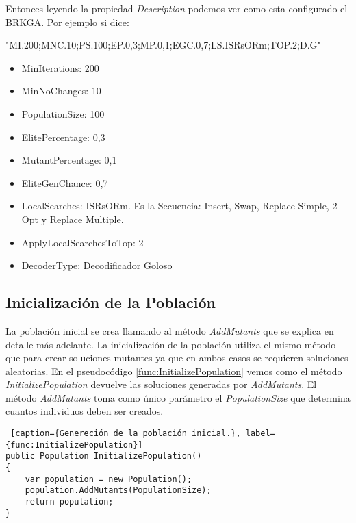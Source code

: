 \begin{minipage}{\textwidth}
Entonces leyendo la propiedad \textit{Description} podemos ver como esta configurado el BRKGA. Por ejemplo si dice: 

\bigskip"MI.200;MNC.10;PS.100;EP.0,3;MP.0,1;EGC.0,7;LS.ISRsORm;TOP.2;D.G"

\begin{itemize}
  \item MinIterations: 200
  \item MinNoChanges: 10
  \item PopulationSize: 100
  \item ElitePercentage: 0,3
  \item MutantPercentage: 0,1
  \item EliteGenChance: 0,7
  \item LocalSearches: ISRsORm. Es la Secuencia: Insert, Swap, Replace Simple, 2-Opt y Replace Multiple.
  \item ApplyLocalSearchesToTop: 2
  \item DecoderType: Decodificador Goloso
\end{itemize}
\end{minipage}

\subsection{Inicialización de la Población}\label{subsec:InitializePopulation}

La población inicial se crea llamando al método \textit{AddMutants} que se explica en detalle más adelante. La inicialización de la población utiliza el mismo método que para crear soluciones mutantes ya que en ambos casos se requieren soluciones aleatorias. En el pseudocódigo \ref{func:InitializePopulation} vemos como el método \textit{InitializePopulation} devuelve las soluciones generadas por \textit{AddMutants}. El método \textit{AddMutants} toma como único parámetro el \textit{PopulationSize} que determina cuantos individuos deben ser creados.

\begin{minipage}{\linewidth}
\begin{lstlisting} [caption={Genereción de la población inicial.}, label={func:InitializePopulation}]
public Population InitializePopulation()
{ 
	var population = new Population();
	population.AddMutants(PopulationSize);
	return population;
}
\end{lstlisting}
\end{minipage}

